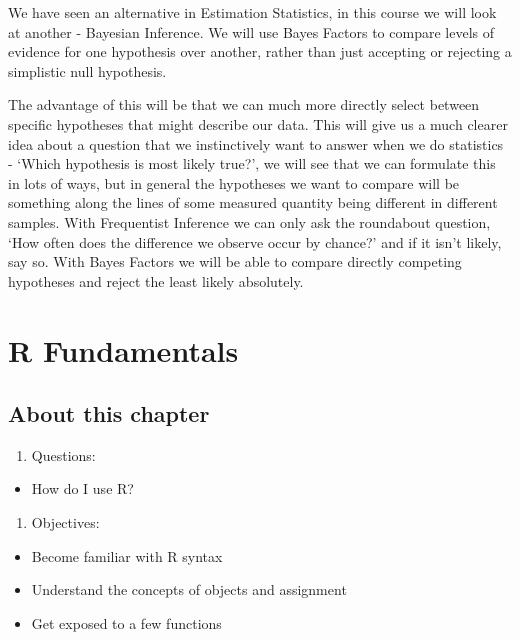 \documentclass[
]{book}
\providecommand{\tightlist}{%
  \setlength{\itemsep}{0pt}\setlength{\parskip}{0pt}}
\begin{document}
We have seen an alternative in Estimation Statistics, in this course we will look at another - Bayesian Inference. We will use Bayes Factors to compare levels of evidence for one hypothesis over another, rather than just accepting or rejecting a simplistic null hypothesis.

The advantage of this will be that we can much more directly select between specific hypotheses that might describe our data. This will give us a much clearer idea about a question that we instinctively want to answer when we do statistics - `Which hypothesis is most likely true?', we will see that we can formulate this in lots of ways, but in general the hypotheses we want to compare will be something along the lines of some measured quantity being different in different samples. With Frequentist Inference we can only ask the roundabout question, `How often does the difference we observe occur by chance?' and if it isn't likely, say so. With Bayes Factors we will be able to compare directly competing hypotheses and reject the least likely absolutely.

\hypertarget{r-fundamentals}{%
\chapter{R Fundamentals}\label{r-fundamentals}}

\hypertarget{about-this-chapter}{%
\section{About this chapter}\label{about-this-chapter}}

\begin{enumerate}
\def\labelenumi{\arabic{enumi}.}
\tightlist
\item
  Questions:
\end{enumerate}

\begin{itemize}
\tightlist
\item
  How do I use R?
\end{itemize}

\begin{enumerate}
\def\labelenumi{\arabic{enumi}.}
\setcounter{enumi}{1}
\tightlist
\item
  Objectives:
\end{enumerate}

\begin{itemize}
\tightlist
\item
  Become familiar with R syntax
\item
  Understand the concepts of objects and assignment
\item
  Get exposed to a few functions
\end{itemize}
\end{document}
